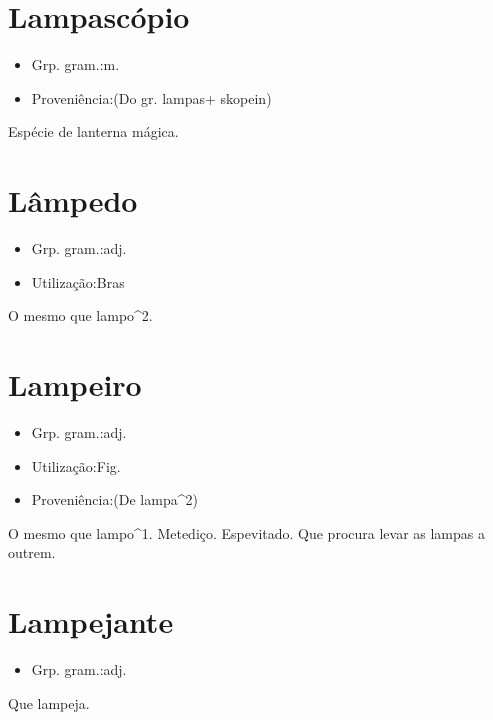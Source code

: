 \section{Lampascópio}
\begin{itemize}
\item {Grp. gram.:m.}
\end{itemize}
\begin{itemize}
\item {Proveniência:(Do gr. \textunderscore lampas\textunderscore  + \textunderscore skopein\textunderscore )}
\end{itemize}
Espécie de lanterna mágica.
\section{Lâmpedo}
\begin{itemize}
\item {Grp. gram.:adj.}
\end{itemize}
\begin{itemize}
\item {Utilização:Bras}
\end{itemize}
O mesmo que \textunderscore lampo\textunderscore ^2.
\section{Lampeiro}
\begin{itemize}
\item {Grp. gram.:adj.}
\end{itemize}
\begin{itemize}
\item {Utilização:Fig.}
\end{itemize}
\begin{itemize}
\item {Proveniência:(De \textunderscore lampa\textunderscore ^2)}
\end{itemize}
O mesmo que \textunderscore lampo\textunderscore ^1.
Metediço.
Espevitado.
Que procura levar as lampas a outrem.
\section{Lampejante}
\begin{itemize}
\item {Grp. gram.:adj.}
\end{itemize}
Que lampeja.
